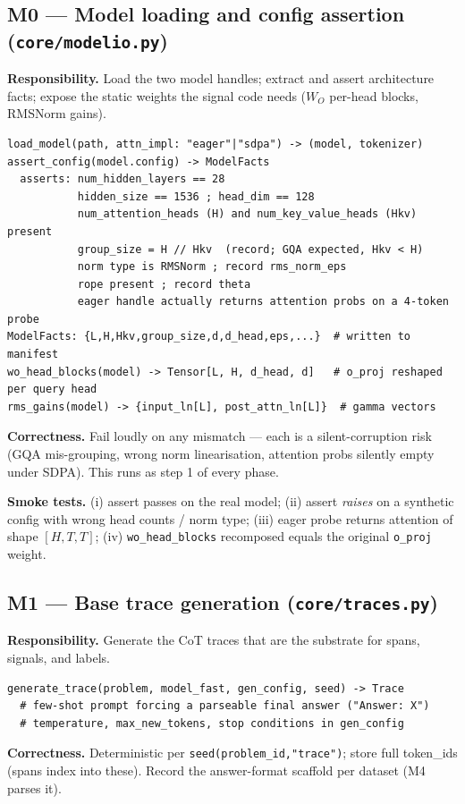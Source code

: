 \documentclass[11pt]{article}
\begin{document}
\subsection{M0 --- Model loading and config assertion (\texttt{core/modelio.py})}
\label{sec:m0}
\textbf{Responsibility.} Load the two model handles; extract and assert architecture facts; expose the
static weights the signal code needs ($W_O$ per-head blocks, RMSNorm gains).
\begin{lstlisting}
load_model(path, attn_impl: "eager"|"sdpa") -> (model, tokenizer)
assert_config(model.config) -> ModelFacts
  asserts: num_hidden_layers == 28
           hidden_size == 1536 ; head_dim == 128
           num_attention_heads (H) and num_key_value_heads (Hkv) present
           group_size = H // Hkv  (record; GQA expected, Hkv < H)
           norm type is RMSNorm ; record rms_norm_eps
           rope present ; record theta
           eager handle actually returns attention probs on a 4-token probe
ModelFacts: {L,H,Hkv,group_size,d,d_head,eps,...}  # written to manifest
wo_head_blocks(model) -> Tensor[L, H, d_head, d]   # o_proj reshaped per query head
rms_gains(model) -> {input_ln[L], post_attn_ln[L]}  # gamma vectors
\end{lstlisting}
\textbf{Correctness.} Fail loudly on any mismatch --- each is a silent-corruption risk (GQA mis-grouping,
wrong norm linearisation, attention probs silently empty under SDPA). This runs as step 1 of every phase.

\textbf{Smoke tests.} (i) assert passes on the real model; (ii) assert \emph{raises} on a synthetic
config with wrong head counts / norm type; (iii) eager probe returns attention of shape $[H,T,T]$;
(iv) \texttt{wo\_head\_blocks} recomposed equals the original \texttt{o\_proj} weight.

\subsection{M1 --- Base trace generation (\texttt{core/traces.py})}
\textbf{Responsibility.} Generate the CoT traces that are the substrate for spans, signals, and labels.
\begin{lstlisting}
generate_trace(problem, model_fast, gen_config, seed) -> Trace
  # few-shot prompt forcing a parseable final answer ("Answer: X")
  # temperature, max_new_tokens, stop conditions in gen_config
\end{lstlisting}
\textbf{Correctness.} Deterministic per \texttt{seed(problem\_id,"trace")}; store full token\_ids (spans
index into these). Record the answer-format scaffold per dataset (M4 parses it).
\end{document}
